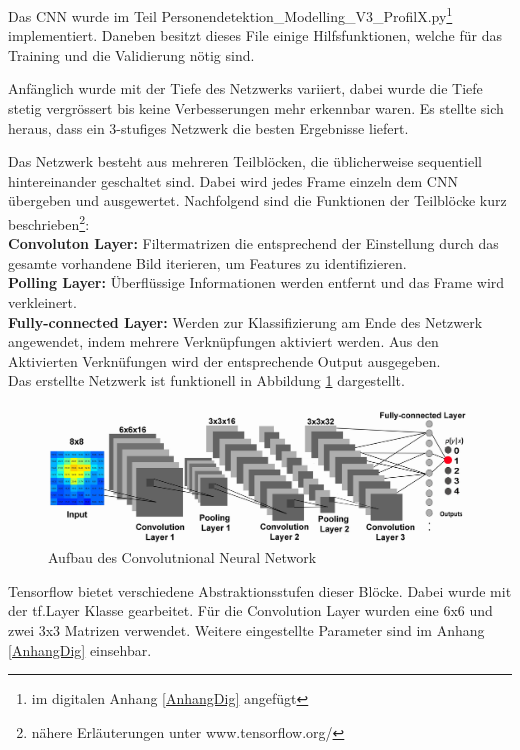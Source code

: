 Das \ac{CNN} wurde im Teil Personendetektion\_Modelling\_V3\_ProfilX.py\footnote{im digitalen Anhang \ref{AnhangDig} angefügt} implementiert. Daneben besitzt dieses File einige Hilfsfunktionen, welche für das Training und die Validierung nötig sind.

Anfänglich wurde mit der Tiefe des Netzwerks variiert, dabei wurde die Tiefe stetig vergrössert bis keine Verbesserungen mehr erkennbar waren. Es stellte sich heraus, dass ein 3-stufiges Netzwerk die besten Ergebnisse liefert.

Das Netzwerk besteht aus mehreren Teilblöcken, die üblicherweise sequentiell hintereinander geschaltet sind. Dabei wird jedes Frame einzeln dem CNN übergeben und ausgewertet. Nachfolgend sind die Funktionen der Teilblöcke kurz beschrieben\footnote{nähere Erläuterungen unter www.tensorflow.org/ }: \\

\textbf{Convoluton Layer:} Filtermatrizen die entsprechend der Einstellung durch das gesamte vorhandene Bild iterieren, um Features zu identifizieren.   \\
\textbf{Polling Layer:} Überflüssige Informationen werden entfernt und das Frame wird verkleinert.   \\
\textbf{Fully-connected Layer:} Werden zur Klassifizierung am Ende des Netzwerk angewendet, indem mehrere Verknüpfungen aktiviert werden. Aus den Aktivierten Verknüfungen wird der entsprechende Output ausgegeben.   \\

Das erstellte Netzwerk ist funktionell in Abbildung \ref{fig:CNN} dargestellt.
\begin{figure}[H]
	\centering
	\includegraphics[width=1\textwidth]
	{fig/CNN_broschuere.jpg}
	\caption[Aufbau des Convolutional Neural Network]{Aufbau des Convolutnional Neural Network}
	\label{fig:CNN}
\end{figure}

Tensorflow bietet verschiedene Abstraktionsstufen dieser Blöcke. Dabei wurde mit der tf.Layer Klasse gearbeitet.
Für die Convolution Layer wurden eine 6x6 und zwei 3x3 Matrizen verwendet.  Weitere eingestellte Parameter sind im  Anhang \ref{AnhangDig} einsehbar.


